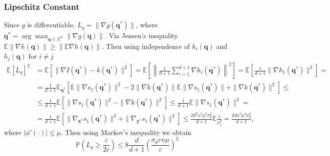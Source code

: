 \subsubsection{Lipschitz Constant}
Since $g$ is differentiable, $L_g = \|\nabla g(\mathbf{q}^*) \|$,
where $\mathbf{q}^* = \arg\max_{\mathbf{q} \in \mathcal{X}^2}\|\nabla g(\mathbf{q})\|$.
Via Jensen's inequality ${\mathbb{E}\|\nabla h(\mathbf{q})\| \geq \|\mathbb{E} \nabla h(\mathbf{q})\|}$.
Then using independence of $h_i(\mathbf{q})$ and $h_j(\mathbf{q})$ for $i \neq j$
\begin{align*}
\mathbb{E}[L_g]^2 & = \mathbb{E} \left [ \|\nabla I(\mathbf{q^*}) - k(\mathbf{q}^*) \|^2\right ] =
\mathbb{E} \left [ \left \|\frac{1}{d + 1} \sum_{i = 1}^{d + 1} \nabla h_i(\mathbf{q}^*)\right \|^2 \right] =
\mathbb{E} \left [ \frac{1}{d + 1} \|\nabla h_1(\mathbf{q}^*) \|^2 \right ] = \\
&= \frac{1}{d + 1}\mathbb{E}_{\mathbf{q}^*}\left [ \mathbb{E} \|\nabla s_1(\mathbf{q}^*)\|^2 -
2 \|\nabla k(\mathbf{q}^*)\| \mathbb{E} \|\nabla s_1(\mathbf{q}^*)\| + \|\nabla k(\mathbf{q}^*)\|^2  \right] \leq \\
& \leq \frac{1}{d + 1} \mathbb{E} \left [ \|\nabla s_1(\mathbf{q}^*)\|^2 - \|\nabla k(\mathbf{q}^*)\|^2 \right ] \leq
\frac{1}{d + 1} \mathbb{E}\|\nabla s_1(\mathbf{q}^*)\|^2 = \\
&= \frac{1}{d + 1}\mathbb{E}\left [ \|\nabla_{\mathbf{x}^*} s_1(\mathbf{q}^*)\|^2 + \|\nabla_{\mathbf{y}^*} s_1(\mathbf{q}^*)\|^2 \right ] \leq
\frac{2d^2 \kappa^2 \mu^2 \sigma_p^2}{d + 1} \mathbb{E}\frac{1}{\rho_1^2} = \frac{2d \kappa^2 \mu^2 \sigma_p^2}{d + 1},
\end{align*}
where $|\phi'(\cdot)| \leq \mu$.
Then using Markov's inequality we obtain
\[
\mathbb{P}(L_g \geq \frac{\varepsilon}{2r}) \leq 8 \frac{d}{d + 1} \left ( \frac{\sigma_p r \kappa \mu}{\varepsilon} \right)^2
\]

